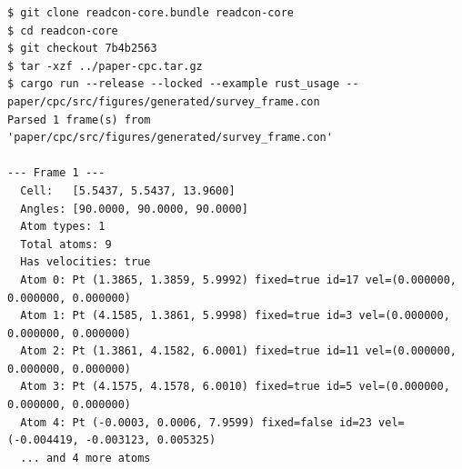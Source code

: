 \begin{lstlisting}[caption={Test run. The example program of readcon-core 0.18.1, built with rustc 1.88.0, reads Listing~\ref{lst:frame} and prints its cell, its counts and its first five atoms with their fixed flags, identifiers and velocities.},label={lst:testrun}]
$ git clone readcon-core.bundle readcon-core
$ cd readcon-core
$ git checkout 7b4b2563
$ tar -xzf ../paper-cpc.tar.gz
$ cargo run --release --locked --example rust_usage -- paper/cpc/src/figures/generated/survey_frame.con
Parsed 1 frame(s) from 'paper/cpc/src/figures/generated/survey_frame.con'

--- Frame 1 ---
  Cell:   [5.5437, 5.5437, 13.9600]
  Angles: [90.0000, 90.0000, 90.0000]
  Atom types: 1
  Total atoms: 9
  Has velocities: true
  Atom 0: Pt (1.3865, 1.3859, 5.9992) fixed=true id=17 vel=(0.000000, 0.000000, 0.000000)
  Atom 1: Pt (4.1585, 1.3861, 5.9998) fixed=true id=3 vel=(0.000000, 0.000000, 0.000000)
  Atom 2: Pt (1.3861, 4.1582, 6.0001) fixed=true id=11 vel=(0.000000, 0.000000, 0.000000)
  Atom 3: Pt (4.1575, 4.1578, 6.0010) fixed=true id=5 vel=(0.000000, 0.000000, 0.000000)
  Atom 4: Pt (-0.0003, 0.0006, 7.9599) fixed=false id=23 vel=(-0.004419, -0.003123, 0.005325)
  ... and 4 more atoms
\end{lstlisting}
